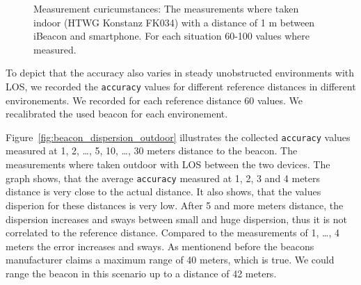 \begin{figure}
\caption {Measurement curicumstances: The measurements where taken indoor (HTWG Konstanz FK034) with a distance of 1 m between iBeacon and smartphone. For each situation 60-100 values where measured.\\
}
\label{fig:beacon_eval_situations}
\end{figure}


To depict that the accuracy also varies in steady unobstructed environments with \acs{LOS}, we recorded the \texttt{accuracy} values for different reference distances in different environements.
We recorded for each reference distance 60 values.
We recalibrated the used beacon for each environement.

Figure~\ref{fig:beacon_dispersion_outdoor} illustrates the collected \texttt{accuracy} values measured at 1, 2, \ldots, 5, 10, \ldots, 30 meters distance to the beacon. The measurements where taken outdoor with \acl{LOS} between the two devices.
The graph shows, that the average \texttt{accuracy} measured at 1, 2, 3 and 4 meters distance is very close to the actual distance.
It also shows, that the values disperion for these distances is very low.
After 5 and more meters distance, the dispersion increases and sways between small and huge dispersion, thus it is not correlated to the reference distance.
Compared to the measurements of 1, \ldots, 4 meters the error increases and sways.
As mentionend before the beacons manufacturer claims a maximum range of 40 meters, which is true.
We could range the beacon in this scenario up to a distance of 42 meters.

